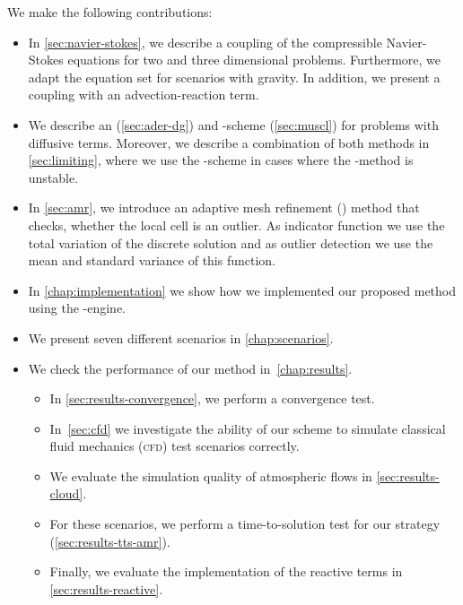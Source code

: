 We make the following contributions:
\begin{itemize}
\item In \cref{sec:navier-stokes}, we describe a coupling of the compressible Navier-Stokes equations for two and three dimensional problems.
Furthermore, we adapt the equation set for scenarios with gravity.
In addition, we present a coupling with an advection-reaction term.
\item We describe an \aderdg{} (\cref{sec:ader-dg}) and \muscl{}-scheme (\cref{sec:muscl}) for problems with diffusive terms.
  Moreover, we describe a combination of both methods in \cref{sec:limiting}, where we use the \muscl{}-scheme in cases where the \aderdg{}-method is unstable.
\item In \cref{sec:amr}, we introduce an adaptive mesh refinement (\amr{}) method that checks, whether the local cell is an outlier.
  As indicator function we use the total variation of the discrete solution and as outlier detection we use the mean and standard variance of this function.
\item In \cref{chap:implementation} we show how we implemented our proposed method using the \exahype{}-engine.
\item We present seven different scenarios in \cref{chap:scenarios}.
\item We check the performance of our method in~\cref{chap:results}.
  \begin{itemize}
  \item In \cref{sec:results-convergence}, we perform a convergence test.
  \item In~\cref{sec:cfd} we investigate the ability of our scheme to simulate classical fluid mechanics (\textsc{cfd}) test scenarios correctly.
  \item We evaluate the simulation quality of atmospheric flows in \cref{sec:results-cloud}.
  \item For these scenarios, we perform a time-to-solution test for our \amr{} strategy (\cref{sec:results-tts-amr}).
  \item Finally, we evaluate the implementation of the reactive terms in \cref{sec:results-reactive}.
\end{itemize}
\end{itemize}

